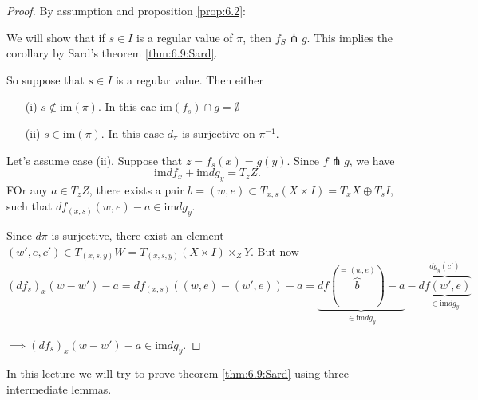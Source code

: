 \begin{proof}
    By assumption and proposition \ref{prop:6.2}: 
    \begin{center}
    \end{center}
    We will show that if \(s\in I\) is a regular value of \(\pi\), then \(f_S\pitchfork g\). This implies the corollary
    by Sard's theorem \ref{thm:6.9:Sard}.
    
    So suppose that \(s\in I \) is a regular value. Then either 
    \begin{enumerate}
        \item[(i)] \(s\notin\text{im}(\pi)\). In this cae \(\text{im}(f_s)\cap g=\emptyset\)
        \item[(ii)] \(s\in\text{im}(\pi)\). In this case \(d_\pi\)  is surjective on \(\pi^{-1}\). 
    \end{enumerate}
    Let's assume case (ii). Suppose that \(z=f_s(x)=g(y)\). Since  \(f\pitchfork g\), we have 
    \[\text{im}df_x+\text{im}dg_y=T_zZ.\]
    FOr any \(a\in T_zZ\), there exists a pair \(b=(w,e)\subset T_{x,s}(X\times I)=T_xX\oplus T_sI\),
    such that \(df_{(x,s)}(w,e)-a\in \text{im}dg_y.\) 

    Since \(d\pi\) is surjective, there exist an element \((w',e,c')\in T_{(x,s,y)}W=T_{(x,s,y)}(X\times I)\times_ZY\).
    But now \[(df_s)_x(w-w')-a=df_{(x,s)}((w,e)-(w',e))-a=\underbrace{df(\overbrace{b}^{=(w,e)})-a}_{\in \text{im}dg_y}-\underbrace{\overbrace{df(w',e)}^{dg_y(c')}}_{\in \text{im}dg_y}\]
    \begin{center}
    \end{center}
    \(\implies (df_s)_x(w-w')-a\in \text {im}dg_y\).

\end{proof}


In this lecture we will try to prove theorem \ref{thm:6.9:Sard} using three intermediate lemmas.

